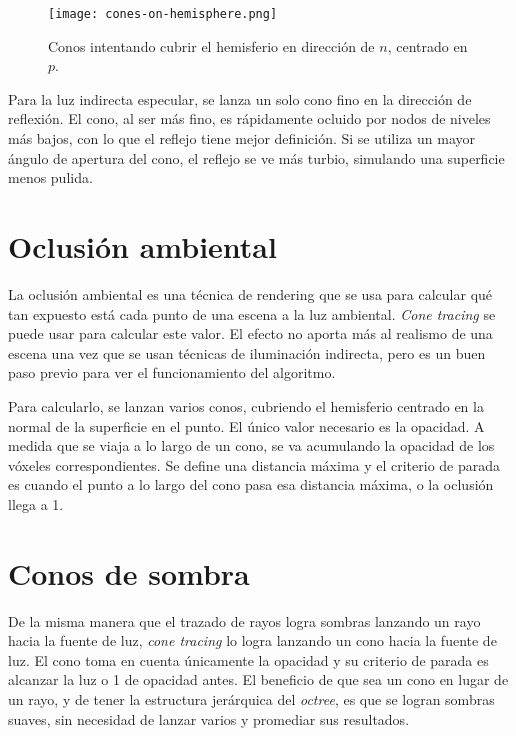 \begin{figure}[hb]
    \centering
    \texttt{[image: cones-on-hemisphere.png]}
    \caption{Conos intentando cubrir el hemisferio en dirección de $n$, centrado en $p$.}
    \label{fig:cone-hemisphere}
\end{figure}

Para la luz indirecta especular, se lanza un solo cono fino en la dirección de reflexión.
El cono, al ser más fino, es rápidamente ocluido por nodos de niveles más bajos, con lo que el reflejo tiene mejor definición.
Si se utiliza un mayor ángulo de apertura del cono, el reflejo se ve más turbio, simulando una superficie menos pulida.

\section{Oclusión ambiental}

La oclusión ambiental es una técnica de rendering que se usa para calcular qué tan expuesto está cada punto de una escena a la luz ambiental.
\textit{Cone tracing} se puede usar para calcular este valor.
El efecto no aporta más al realismo de una escena una vez que se usan técnicas de iluminación indirecta, pero es un buen paso previo para ver el funcionamiento del algoritmo.

Para calcularlo, se lanzan varios conos, cubriendo el hemisferio centrado en la normal de la superficie en el punto.
El único valor necesario es la opacidad.
A medida que se viaja a lo largo de un cono, se va acumulando la opacidad de los vóxeles correspondientes.
Se define una distancia máxima y el criterio de parada es cuando el punto a lo largo del cono pasa esa distancia máxima, o la oclusión llega a 1.

\section{Conos de sombra}

De la misma manera que el trazado de rayos logra sombras lanzando un rayo hacia la fuente de luz, \textit{cone tracing} lo logra lanzando un cono hacia la fuente de luz.
El cono toma en cuenta únicamente la opacidad y su criterio de parada es alcanzar la luz o 1 de opacidad antes.
El beneficio de que sea un cono en lugar de un rayo, y de tener la estructura jerárquica del \textit{octree}, es que se logran sombras suaves, sin necesidad de lanzar varios y promediar sus resultados.

